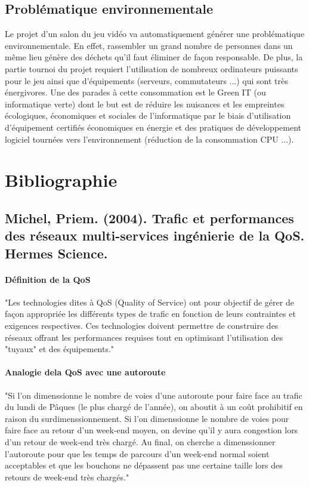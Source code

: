 \documentclass[french]{article}
\begin{document}
\subsection{Problématique environnementale}

Le projet d'un salon du jeu vidéo va automatiquement générer une problématique environnementale. En effet, rassembler un grand nombre de personnes dans un même lieu génère des déchets qu'il faut éliminer de façon responsable. De plus, la partie tournoi du projet requiert l'utilisation de nombreux ordinateurs puissants pour le jeu ainsi que d'équipements (serveurs, commutateurs ...) qui sont très énergivores. Une des parades à cette consommation est le Green IT (ou informatique verte) dont le but est de réduire les nuisances et les empreintes écologiques, économiques et sociales de l'informatique par le biais d'utilisation d'équipement certifiés économiques en énergie et des pratiques de développement logiciel tournées vers l'environnement (réduction de la consommation CPU ...).

\newpage

\section{Bibliographie}

\subsection*{Michel, Priem. (2004). Trafic et performances des réseaux multi-services ingénierie de la QoS. Hermes Science.}

\paragraph{Définition de la QoS}

"Les technologies dites à QoS (Quality of Service) ont pour objectif de gérer de façon appropriée les différents types de trafic en fonction de leurs contraintes et exigences respectives.
Ces technologies doivent permettre de construire des réseaux offrant les performances requises tout en optimisant l'utilisation des "tuyaux" et des équipements."

\paragraph{Analogie dela QoS avec une autoroute}

"Si l'on dimenssionne le nombre de voies d'une autoroute pour faire face au trafic du lundi de Pâques (le plus chargé de l'année), on aboutit à un coût prohibitif en raison du surdimenssionnement.
Si l'on dimenssionne le nombre de voies pour faire face au retour d'un week-end moyen, on devine qu'il y aura congestion lors d'un retour de week-end très chargé.
Au final, on cherche a dimenssionner l'autoroute pour que les temps de parcours d'un week-end normal soient acceptables et que les bouchons ne dépassent pas une certaine taille lors des retours de week-end très chargés."
\end{document}
